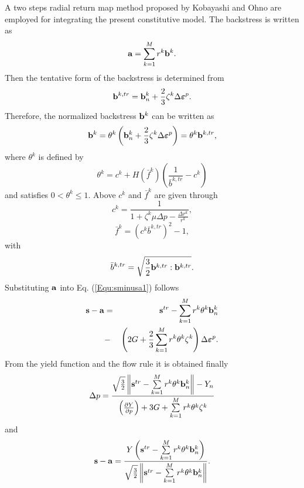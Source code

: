 \documentclass[preprint,5p,twocolumn,11pt,sort&compress]{elsarticle}
\newcommand{\bfepsilon}{{\mbox{\boldmath{$\varepsilon$}}}}
\newcommand{\bfa}{{\bf a}}
\newcommand{\bfb}{{\bf b}}
\newcommand{\bfs}{{\bf s}}
\begin{document}
A two steps radial return map method proposed by  Kobayashi and Ohno \cite{kobayashi2002implementation} are employed for integrating the present constitutive model. The backstress is written as
\begin{equation}
{\bfa} = \sum\limits_{k = 1}^M {r^k\bfb^k}.
\end{equation}
Then the tentative form of the backstress is determined from
\begin{equation}
\label{Equ:btrn+1}
\bfb^{k,tr} = \bfb_n^k + \frac{2}{3}{\zeta ^k}\Delta \bfepsilon^p.
\end{equation}
Therefore, the normalized backstress $\bfb^k$ can be written as
\begin{equation}
\label{Equ:bn+1}
\bfb^k = \theta ^k\left( {\bfb_n^k + \frac{2}{3}{\zeta ^k}\Delta \bfepsilon^p} \right) = \theta ^k\bfb^{k,tr},
\end{equation}
where $\theta ^k$ is defined by
\begin{equation}
\label{Equ:thetan+1}
\theta ^k = c^k + H\left( {\bar f^k} \right)\left( {\frac{1}{{\bar b^{k,tr}}} - c^k} \right)
\end{equation}
 and satisfies $0 < \theta ^k \leqslant 1$. Above $c^k$ and ${\bar f^k}$ are given through
\[
c^k = \frac{1}{{1 + {\zeta ^k}\mu \Delta {p} - \frac{{\Delta r^k}}{{r^k}}}},
\]
\[
\bar f^k = {\left( {c^k\bar b^{k,tr}} \right)^2} - 1,
\]
with
\[
\bar b^{k,tr} = \sqrt {\frac{3}{2}\bfb^{k,tr}:\bfb^{k,tr}}.
\]
Substituting ${\bfa}$ into Eq. (\ref{Equ:sminusa1}) follows
\begin{eqnarray}
\label{Equ:sminusa2}
{{\bfs} - {\bfa}}&=&
\bfs^{tr} - \sum\limits_{k = 1}^M {r^k\theta ^k\bfb_n^k}
\\ \nonumber
&-& \left( {2G + \frac{2}{3}\sum\limits_{k = 1}^M {r^k\theta ^k{\zeta ^k}} } \right)\Delta \bfepsilon^p.
\end{eqnarray}
From the yield function and the flow rule it is obtained finally
\begin{equation}
\Delta {p} = \frac{{\sqrt {\frac{3}{2}} \left\| {\bfs^{tr} - \sum\limits_{k = 1}^M {r^k\theta ^k\bfb_n^k} } \right\| - {Y_n}}}{{{{\left( {\frac{{\partial Y}}{{\partial p}}} \right)}} + 3G + \sum\limits_{k = 1}^M {r^k\theta ^k{\zeta ^k}} }}
\end{equation}
and
\begin{equation}
{\bfs} - {\bfa} = \frac{{{Y}\left( {\bfs^{tr} - \sum\limits_{k = 1}^M {r^k\theta ^k\bfb_n^k} } \right)}}{{\sqrt {\frac{3}{2}} \left\| {\bfs^{tr} - \sum\limits_{k = 1}^M {r^k\theta ^k\bfb_n^k} } \right\|}}.
\end{equation}
\end{document}
